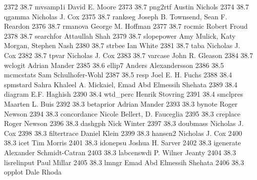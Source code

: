   2372     38.7    mvsamp1i      David E. Moore                          
  2373     38.7    png2rtf       Austin Nichols                          
  2374     38.7    qgamma        Nicholas J. Cox                         
  2375     38.7    rankseg       Joseph B. Townsend, Sean F. Reardon     
  2376     38.7    rmanova       George M. Hoffman                       
  2377     38.7    rocmic        Robert Froud                            
  2378     38.7    searchfor     Attaullah Shah                          
  2379     38.7    slopepower    Amy Mulick, Katy Morgan, Stephen Nash   
  2380     38.7    strbee        Ian White                               
  2381     38.7    taba          Nicholas J. Cox                         
  2382     38.7    tpvar         Nicholas J. Cox                         
  2383     38.7    varcase       John R. Gleason                         
  2384     38.7    wclogit       Adrian Mander                           
  2385     38.6    ellip7        Anders Alexandersson                    
  2386     38.5    mcmcstats     Sam Schulhofer-Wohl                     
  2387     38.5    resp          Joel E. H. Fuchs                        
  2388     38.4    spmstard      Sahra Khaleel A. Mickaiel, Emad Abd     
                                   Elmessih Shehata                        
  2389     38.4    diagram       E.F. Haghish                            
  2390     38.4    wtd_perc      Henrik Stovring                         
  2391     38.4    smclpres      Maarten L. Buis                         
  2392     38.3    betaprior     Adrian Mander                           
  2393     38.3    bynote        Roger Newson                            
  2394     38.3    concordance   Nicole Bellert, D. Fauceglia            
  2395     38.3    creplace      Roger Newson                            
  2396     38.3    dashgph       Nick Winter                             
  2397     38.3    doubmass      Nicholas J. Cox                         
  2398     38.3    filtertrace   Daniel Klein                            
  2399     38.3    hansen2       Nicholas J. Cox                         
  2400     38.3    icet          Tim Morris                              
  2401     38.3    idonepsu      Joshua H. Sarver                        
  2402     38.3    igenerate     Alexander Schmidt-Catran                
  2403     38.3    labcenswdi    P. Wilner Jeanty                        
  2404     38.3    lisrelinput   Paul Millar                             
  2405     38.3    lmngr         Emad Abd Elmessih Shehata               
  2406     38.3    opplot        Dale Rhoda                              
